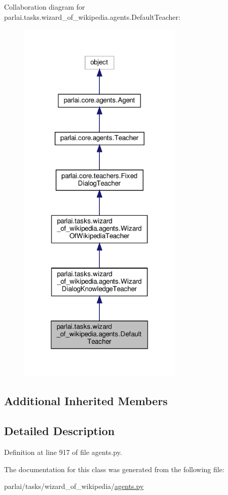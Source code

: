 Collaboration diagram for parlai.\+tasks.\+wizard\+\_\+of\+\_\+wikipedia.\+agents.\+Default\+Teacher\+:
\nopagebreak
\begin{figure}[H]
\begin{center}
\leavevmode
\includegraphics[width=223pt]{de/dc7/classparlai_1_1tasks_1_1wizard__of__wikipedia_1_1agents_1_1DefaultTeacher__coll__graph}
\end{center}
\end{figure}
\subsection*{Additional Inherited Members}


\subsection{Detailed Description}


Definition at line 917 of file agents.\+py.



The documentation for this class was generated from the following file\+:\begin{DoxyCompactItemize}
\item 
parlai/tasks/wizard\+\_\+of\+\_\+wikipedia/\hyperlink{parlai_2tasks_2wizard__of__wikipedia_2agents_8py}{agents.\+py}\end{DoxyCompactItemize}
